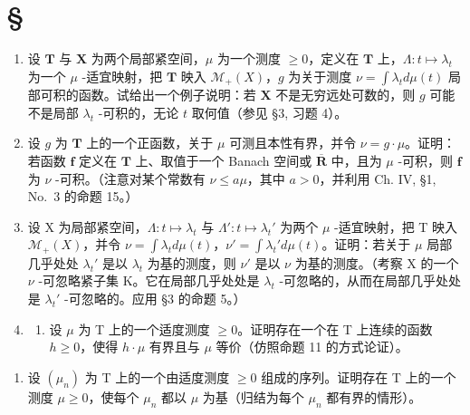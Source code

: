 \section*{\texorpdfstring{\S\CurrentExerciseGroup}{第{\CurrentExerciseGroup}节}}
{}

\begin{enumerate}
\def\labelenumi{\arabic{enumi})}
\item
  设 \(\mathbf{T}\) 与 \(\mathbf{X}\) 为两个局部紧空间，\(\mu\) 为一个测度 \(\geqslant 0\)，定义在 \(\mathbf{T}\) 上，\(\Lambda : t \mapsto \lambda_t\) 为一个 \(\mu\) -适宜映射，把 \(\mathbf{T}\) 映入 \(\mathcal{M}_+(X)\)，\(g\) 为关于测度 \(\nu = \int \lambda_t d\mu(t)\) 局部可积的函数。试给出一个例子说明：若 \(\mathbf{X}\) 不是无穷远处可数的，则 \(g\) 可能不是局部 \(\lambda_t\) -可积的，无论 \(t\) 取何值（参见 §3, 习题 4）。
\item
  设 \(g\) 为 \(\mathbf{T}\) 上的一个正函数，关于 \(\mu\) 可测且本性有界，并令 \(\nu = g \cdot \mu\)。证明：若函数 \(\mathbf{f}\) 定义在 \(\mathbf{T}\) 上、取值于一个 Banach 空间或 \(\overline{\mathbf{R}}\) 中，且为 \(\mu\) -可积，则 \(\mathbf{f}\) 为 \(\nu\) -可积。（注意对某个常数有 \(\nu \leqslant a\mu\)，其中 \(a > 0\)，并利用 Ch. IV, §1, No.~3 的命题 15。）
\item
  设 X 为局部紧空间，\(\Lambda : t \mapsto \lambda_t\) 与 \(\Lambda': t \mapsto \lambda_t'\) 为两个 \(\mu\) -适宜映射，把 T 映入 \(\mathcal{M}_+(X)\)，并令 \(\nu = \int \lambda_t d\mu(t)\)，\(\nu' = \int \lambda_t' d\mu(t)\)。证明：若关于 \(\mu\) 局部几乎处处 \(\lambda_t'\) 是以 \(\lambda_t\) 为基的测度，则 \(\nu'\) 是以 \(\nu\) 为基的测度。（考察 X 的一个 \(\nu\) -可忽略紧子集 K。它在局部几乎处处是 \(\lambda_t\) -可忽略的，从而在局部几乎处处是 \(\lambda_t'\) -可忽略的。应用 §3 的命题 5。）
\item
  \begin{enumerate}
  \def\labelenumii{\alph{enumii})}
  \tightlist
  \item
    设 \(\mu\) 为 T 上的一个适度测度 \(\geqslant 0\)。证明存在一个在 T 上连续的函数 \(h \geqslant 0\)，使得 \(h \cdot \mu\) 有界且与 \(\mu\) 等价（仿照命题 11 的方式论证）。
  \end{enumerate}
\end{enumerate}

\begin{enumerate}
\def\labelenumi{\alph{enumi})}
\setcounter{enumi}{1}
\tightlist
\item
  设 \((\mu_{n})\) 为 T 上的一个由适度测度 \(\geqslant0\) 组成的序列。证明存在 T 上的一个测度 \(\mu\geqslant0\)，使每个 \(\mu_{n}\) 都以 \(\mu\) 为基（归结为每个 \(\mu_{n}\) 都有界的情形）。
\end{enumerate}

